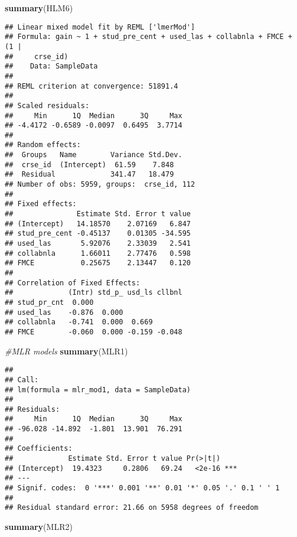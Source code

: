 \documentclass[]{article}
\newenvironment{Shaded}{\begin{snugshade}}{\end{snugshade}}
\newcommand{\KeywordTok}[1]{\textcolor[rgb]{0.13,0.29,0.53}{\textbf{#1}}}
\newcommand{\CommentTok}[1]{\textcolor[rgb]{0.56,0.35,0.01}{\textit{#1}}}
\newcommand{\NormalTok}[1]{#1}
\begin{document}
\begin{Shaded}
\begin{Highlighting}[]
\KeywordTok{summary}\NormalTok{(HLM6)}
\end{Highlighting}
\end{Shaded}

\begin{verbatim}
## Linear mixed model fit by REML ['lmerMod']
## Formula: gain ~ 1 + stud_pre_cent + used_las + collabnla + FMCE + (1 |  
##     crse_id)
##    Data: SampleData
## 
## REML criterion at convergence: 51891.4
## 
## Scaled residuals: 
##     Min      1Q  Median      3Q     Max 
## -4.4172 -0.6589 -0.0097  0.6495  3.7714 
## 
## Random effects:
##  Groups   Name        Variance Std.Dev.
##  crse_id  (Intercept)  61.59    7.848  
##  Residual             341.47   18.479  
## Number of obs: 5959, groups:  crse_id, 112
## 
## Fixed effects:
##               Estimate Std. Error t value
## (Intercept)   14.18570    2.07169   6.847
## stud_pre_cent -0.45137    0.01305 -34.595
## used_las       5.92076    2.33039   2.541
## collabnla      1.66011    2.77476   0.598
## FMCE           0.25675    2.13447   0.120
## 
## Correlation of Fixed Effects:
##             (Intr) std_p_ usd_ls cllbnl
## stud_pr_cnt  0.000                     
## used_las    -0.876  0.000              
## collabnla   -0.741  0.000  0.669       
## FMCE        -0.060  0.000 -0.159 -0.048
\end{verbatim}

\begin{Shaded}
\begin{Highlighting}[]
\CommentTok{#MLR models}
\KeywordTok{summary}\NormalTok{(MLR1)}
\end{Highlighting}
\end{Shaded}

\begin{verbatim}
## 
## Call:
## lm(formula = mlr_mod1, data = SampleData)
## 
## Residuals:
##     Min      1Q  Median      3Q     Max 
## -96.028 -14.892  -1.801  13.901  76.291 
## 
## Coefficients:
##             Estimate Std. Error t value Pr(>|t|)    
## (Intercept)  19.4323     0.2806   69.24   <2e-16 ***
## ---
## Signif. codes:  0 '***' 0.001 '**' 0.01 '*' 0.05 '.' 0.1 ' ' 1
## 
## Residual standard error: 21.66 on 5958 degrees of freedom
\end{verbatim}

\begin{Shaded}
\begin{Highlighting}[]
\KeywordTok{summary}\NormalTok{(MLR2)}
\end{Highlighting}
\end{Shaded}
\end{document}
